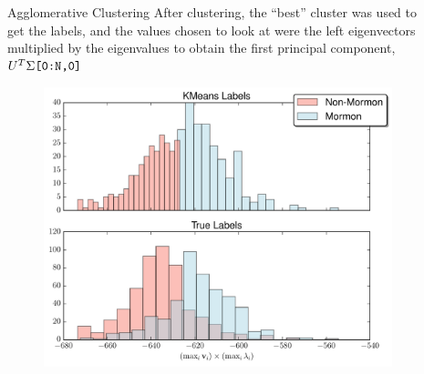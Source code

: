 \documentclass[final]{beamer}
\newlength{\sepwid}
\newlength{\onecolwid}
\begin{document}
\begin{frame}[t]
\begin{columns}[t]
\begin{column}{\onecolwid}
\begin{block}{Agglomerative Clustering}
After clustering, the ``best'' cluster was used to get the labels, and the values chosen to 
look at were the left eigenvectors multiplied by the eigenvalues to obtain the first principal 
component, $U^{T}\Sigma\text{\tt{[0:N,0]}}$


\begin{figure}
\centering
  \includegraphics[width=.85\linewidth]{../data/eigennorm.pdf}
  \label{fig:eigennorm}
\end{figure}


\end{block}



\end{column} %


\begin{column}{\sepwid}\end{column} %

\begin{column}{\onecolwid} %



\end{column}
\end{columns}
\end{frame}
\end{document}
